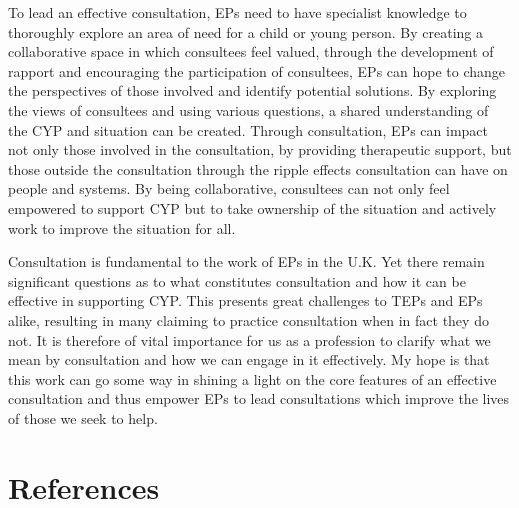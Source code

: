 \documentclass[
  english,
  man,floatsintext]{apa6}
\begin{document}
To lead an effective consultation, EPs need to have specialist knowledge
to thoroughly explore an area of need for a child or young person. By
creating a collaborative space in which consultees feel valued, through
the development of rapport and encouraging the participation of
consultees, EPs can hope to change the perspectives of those involved
and identify potential solutions. By exploring the views of consultees
and using various questions, a shared understanding of the CYP and
situation can be created. Through consultation, EPs can impact not only
those involved in the consultation, by providing therapeutic support,
but those outside the consultation through the ripple effects
consultation can have on people and systems. By being collaborative,
consultees can not only feel empowered to support CYP but to take
ownership of the situation and actively work to improve the situation
for all.

Consultation is fundamental to the work of EPs in the U.K. Yet there remain significant questions as to what
constitutes consultation and how it can be effective in supporting CYP.
This presents great challenges to TEPs and EPs alike, resulting in many
claiming to practice consultation when in fact they do not. It is
therefore of vital importance for us as a profession to clarify what we
mean by consultation and how we can engage in it effectively. My hope is
that this work can go some way in shining a light on the core features
of an effective consultation and thus empower EPs to lead consultations
which improve the lives of those we seek to help.

\newpage

\hypertarget{references}{%
\section{References}\label{references}}

\begingroup
\setlength{\parindent}{-0.5in}
\setlength{\leftskip}{0.5in}
\end{document}
